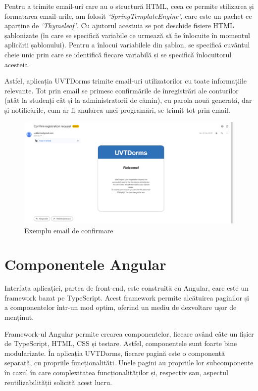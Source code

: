 \documentclass[12pt,a4paper]{report}
\theoremstyle{definition}
\theoremstyle{remark}
\begin{document}
\par Pentru a trimite email-uri care au o structură HTML, ceea ce permite stilizarea și formatarea email-urile, am folosit \textit{`SpringTemplateEngine'}, care este un pachet ce aparține de \textit{`Thymeleaf'}. Cu ajutorul acestuia se pot deschide fișiere HTML șablonizate (în care se specifică variabile ce urmează să fie înlocuite în momentul aplicării șablonului). Pentru a înlocui variabilele din șablon, se specifică cuvântul cheie unic prin care se identifică fiecare variabilă și se specifică înlocuitorul acesteia\cite{template_engine_for_spring_boot}.

\par Astfel, aplicația UVTDorms trimite email-uri utilizatorilor cu toate informațiile relevante. Tot prin email se primesc confirmările de înregistrări ale conturilor (atât la studenți cât și la administratorii de cămin), cu parola nouă generată, dar și notificările, cum ar fi anularea unei programări, se trimit tot prin email.

\begin{figure}[H]
    \centering
    \includegraphics[width=0.8\linewidth]{resurse/ghid_utilizare/email.png}
    \caption{Exemplu email de confirmare }
\end{figure}


\section{Componentele Angular}

\par Interfața aplicației, partea de front-end, este construită cu Angular, care este un framework bazat pe TypeScript\cite{geetha2022interpretation}. Acest framework permite alcătuirea paginilor și a componentelor într-un mod optim, oferind un mediu de dezvoltare ușor de menținut.

\par Framework-ul Angular permite crearea componentelor, fiecare având câte un fișier de TypeScript, HTML, CSS și testare. Astfel, componentele sunt foarte bine modularizate. În aplicația UVTDorms, fiecare pagină este o componentă separată, cu propriile \textnormal{func\-țio\-na\-li\-tă\-ți}. Unele pagini au propriile lor subcomponente în cazul în care complexitatea \textnormal{func\-ți\-o\-na\-li\-tă\-ți\-lor} și, respectiv sau, aspectul reutilizabilității solicită acest lucru.
\end{document}
